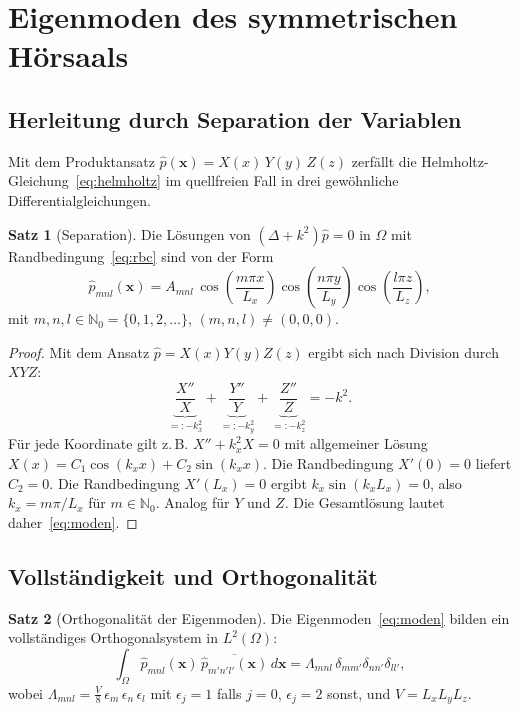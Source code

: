 ﻿\documentclass[12pt, a4paper]{article}
\theoremstyle{definition}
\newtheorem{satz}{Satz}[section]
\theoremstyle{remark}
\newcommand{\N}{\mathbb{N}}
\newcommand{\Lx}{L_x}
\newcommand{\Ly}{L_y}
\newcommand{\Lz}{L_z}
\begin{document}
\section{Eigenmoden des symmetrischen Hörsaals}
\label{sec:eigenmoden}

\subsection{Herleitung durch Separation der Variablen}

Mit dem Produktansatz $\hat{p}(\mathbf{x}) = X(x)\,Y(y)\,Z(z)$ zerfällt
die Helmholtz-Gleichung~\eqref{eq:helmholtz} im quellfreien Fall in drei
gewöhnliche Differentialgleichungen.

\begin{satz}[Separation]
\label{satz:separation}
Die Lösungen von $(\Delta + k^2)\hat{p} = 0$ in $\Omega$ mit
Randbedingung~\eqref{eq:rbc} sind von der Form
\begin{equation}
  \hat{p}_{mnl}(\mathbf{x}) = A_{mnl}\,
  \cos\!\left(\frac{m\pi x}{\Lx}\right)
  \cos\!\left(\frac{n\pi y}{\Ly}\right)
  \cos\!\left(\frac{l\pi z}{\Lz}\right),
  \label{eq:moden}
\end{equation}
mit $m,n,l \in \N_0 = \{0,1,2,\ldots\}$, $(m,n,l) \neq (0,0,0)$.
\end{satz}

\begin{proof}
Mit dem Ansatz $\hat{p} = X(x)Y(y)Z(z)$ ergibt sich nach Division durch $XYZ$:
\[
  \underbrace{\frac{X''}{X}}_{=:-k_x^2}
  + \underbrace{\frac{Y''}{Y}}_{=:-k_y^2}
  + \underbrace{\frac{Z''}{Z}}_{=:-k_z^2}
  = -k^2.
\]
Für jede Koordinate gilt z.\,B. $X'' + k_x^2 X = 0$ mit allgemeiner Lösung
$X(x) = C_1\cos(k_x x) + C_2\sin(k_x x)$.
Die Randbedingung $X'(0) = 0$ liefert $C_2 = 0$.
Die Randbedingung $X'(\Lx) = 0$ ergibt $k_x \sin(k_x \Lx) = 0$,
also $k_x = m\pi/\Lx$ für $m \in \N_0$. Analog für $Y$ und $Z$.
Die Gesamtlösung lautet daher~\eqref{eq:moden}. 
\end{proof}

\subsection{Vollständigkeit und Orthogonalität}

\begin{satz}[Orthogonalität der Eigenmoden]
\label{satz:orth}
Die Eigenmoden~\eqref{eq:moden} bilden ein vollständiges Orthogonalsystem
in $L^2(\Omega)$:
\begin{equation}
  \int_\Omega \hat{p}_{mnl}(\mathbf{x})\,\overline{\hat{p}_{m'n'l'}(\mathbf{x})}\,d\mathbf{x}
  = \Lambda_{mnl}\,\delta_{mm'}\delta_{nn'}\delta_{ll'},
  \label{eq:ortho}
\end{equation}
wobei $\Lambda_{mnl} = \frac{V}{8}\,\epsilon_m\,\epsilon_n\,\epsilon_l$
mit $\epsilon_j = 1$ falls $j=0$, $\epsilon_j = 2$ sonst, und $V = \Lx\Ly\Lz$.
\end{satz}
\end{document}
